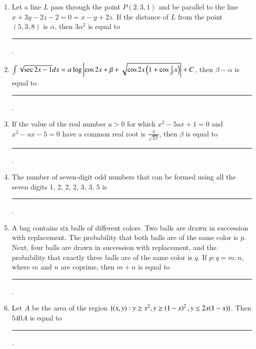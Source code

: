 \documentclass[journal,12pt,onecolumn]{IEEEtran}
\theoremstyle{remark}
\begin{document}
\begin{enumerate}
    \item Let a line $L$ pass through the point $P(2, 3, 1)$ and be parallel to the line $x + 3y - 2z - 2 = 0 = x - y + 2z$. If the distance of $L$ from the point $(5, 3, 8)$ is $\alpha$, then $3\alpha^2$ is equal to \rule{2.5cm}{0.4pt}.
    
    \item $\int \sqrt{\sec{2x} - 1} dx = \alpha\log \left| \cos{2x}+\beta+\sqrt{\cos{2x}\left(1+\cos{\frac{1}{\beta}x}\right)} \right| + C$, then $\beta - \alpha$ is equal to \rule{2.5cm}{0.4pt}.
    
    \item If the value of the real number $a > 0$ for which $x^2 - 5ax + 1 = 0$ and $x^2 - ax - 5 = 0$ have a common real root is $\frac{3}{\sqrt{2\beta}}$, then $\beta$ is equal to \rule{2.5cm}{0.4pt}.
    
    \item The number of seven-digit odd numbers that can be formed using all the seven digits 1, 2, 2, 2, 3, 3, 5 is \rule{2.5cm}{0.4pt}.
    
    \item A bag contains six balls of different colors. Two balls are drawn in succession with replacement. The probability that both balls are of the same color is $p$. Next, four balls are drawn in succession with replacement, and the probability that exactly three balls are of the same color is $q$. If $p : q = m : n$, where $m$ and $n$ are coprime, then $m + n$ is equal to \rule{2.5cm}{0.4pt}.
    
    \item Let $A$ be the area of the region $\{(x, y) : y \geq x^2, y \geq \left(1 - x\right)^2, y \leq 2x(1 - x)\}$. Then $540A$ is equal to \rule{2.5cm}{0.4pt}.
    
\end{enumerate}
\end{document}
